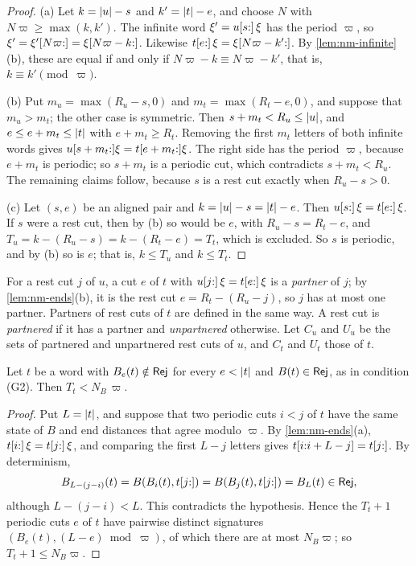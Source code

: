 \begin{proof}
(a) Let $k=\lvert u\rvert-s$ and $k'=\lvert t\rvert-e$, and choose $N$ with
$N\varpi\ge\max(k,k')$. The infinite word $\xi'=u[s{:}]\,\xi$ has the period $\varpi$, so
$\xi'=\xi'[N\varpi{:}]=\xi[N\varpi-k{:}]$. Likewise $t[e{:}]\,\xi=\xi[N\varpi-k'{:}]$. By
\cref{lem:nm-infinite}(b), these are equal if and only if $N\varpi-k\equiv N\varpi-k'$,
that is, $k\equiv k'\pmod \varpi$.

(b) Put $m_u=\max(R_u-s,0)$ and $m_t=\max(R_t-e,0)$, and suppose that
$m_u>m_t$; the other case is symmetric. Then $s+m_t<R_u\le\lvert u\rvert$, and
$e\le e+m_t\le\lvert t\rvert$ with $e+m_t\ge R_t$. Removing the first $m_t$ letters of
both infinite words gives $u[s+m_t{:}]\xi=t[e+m_t{:}]\xi$. The right side
has the period $\varpi$, because $e+m_t$ is periodic; so $s+m_t$ is a periodic cut,
which contradicts $s+m_t<R_u$. The remaining claims follow, because $s$ is a
rest cut exactly when $R_u-s>0$.

(c) Let $(s,e)$ be an aligned pair and $k=\lvert u\rvert-s=\lvert t\rvert-e$. Then
$u[s{:}]\,\xi=t[e{:}]\,\xi$. If $s$ were a rest cut, then by (b) so would be
$e$, with $R_u-s=R_t-e$, and
$T_u=k-(R_u-s)=k-(R_t-e)=T_t$, which is excluded. So $s$ is periodic,
and by (b) so is $e$; that is, $k\le T_u$ and $k\le T_t$.
\end{proof}

For a rest cut $j$ of $u$, a cut $e$ of $t$ with $u[j{:}]\,\xi=t[e{:}]\,\xi$ is
a \emph{partner} of $j$; by \cref{lem:nm-ends}(b), it is the rest cut
$e=R_t-(R_u-j)$, so $j$ has at most one partner. Partners of rest cuts of
$t$ are defined in the same way. A rest cut is \emph{partnered} if it has a
partner and \emph{unpartnered} otherwise. Let $C_u$ and $U_u$ be the sets of
partnered and unpartnered rest cuts of $u$, and $C_t$ and $U_t$ those of $t$.

\begin{lemma}\label{lem:nm-target-end}
Let $t$ be a word with $B_e(t)\notin\mathsf{Rej}$ for every $e<\lvert t\rvert$ and
$B(t)\in\mathsf{Rej}$, as in condition \textup{(G2)}. Then $T_t<N_B\,\varpi$.
\end{lemma}

\begin{proof}
Put $L=\lvert t\rvert$, and suppose that two periodic cuts $i<j$ of $t$ have the same
state of $B$ and end distances that agree modulo $\varpi$. By \cref{lem:nm-ends}(a),
$t[i{:}]\,\xi=t[j{:}]\,\xi$, and comparing the first $L-j$ letters gives
$t[i{:}i+L-j]=t[j{:}]$. By determinism,
\[
 B_{L-(j-i)}(t)=B(B_i(t),t[j{:}])=B(B_j(t),t[j{:}])=B_L(t)\in\mathsf{Rej} ,
\]
although $L-(j-i)<L$. This contradicts the hypothesis. Hence the $T_t+1$
periodic cuts $e$ of $t$ have pairwise distinct signatures
$(B_e(t),(L-e)\bmod \varpi)$, of which there are at most $N_B\varpi$; so
$T_t+1\le N_B\varpi$.
\end{proof}

